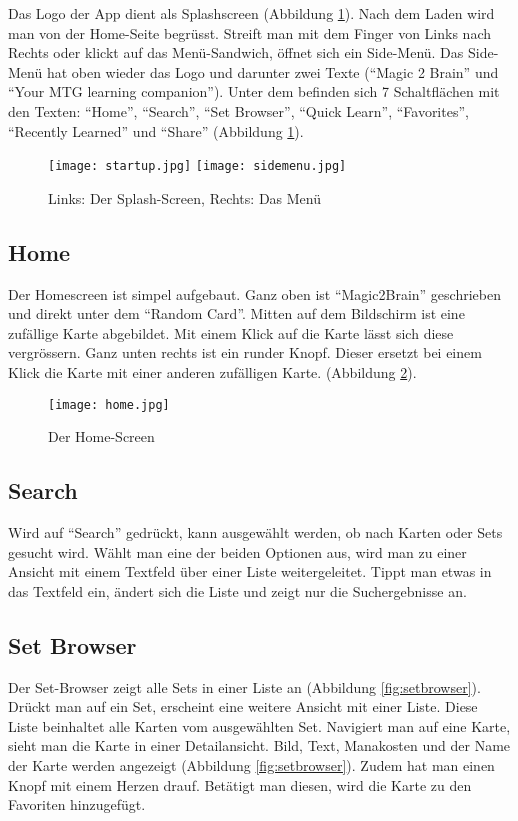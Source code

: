 Das Logo der App dient als Splashscreen (Abbildung \ref{fig:splashundmenu}). Nach dem Laden wird man von der Home-Seite begrüsst. Streift man mit dem Finger von Links nach Rechts oder klickt auf das Menü-Sandwich, öffnet sich ein Side-Menü. Das Side-Menü hat oben wieder das Logo und darunter zwei Texte ("`Magic 2 Brain"' und "`Your MTG learning companion"'). Unter dem befinden sich 7 Schaltflächen mit den Texten: "`Home"', "`Search"', "`Set Browser"', "`Quick Learn"', "`Favorites"', "`Recently Learned"' und "`Share"' (Abbildung \ref{fig:splashundmenu}).

\begin{figure}[htbp]
 \centering
    \texttt{[image: startup.jpg]}
    \texttt{[image: sidemenu.jpg]}
 \caption{Links: Der Splash-Screen, Rechts: Das Menü}
 \label{fig:splashundmenu}
\end{figure}

\subsection{Home}
Der Homescreen ist simpel aufgebaut. Ganz oben ist "`Magic2Brain"' geschrieben und direkt unter dem "`Random Card"'. Mitten auf dem Bildschirm ist eine zufällige Karte abgebildet. Mit einem Klick auf die Karte lässt sich diese vergrössern. Ganz unten rechts ist ein runder Knopf. Dieser ersetzt bei einem Klick die Karte mit einer anderen zufälligen Karte. (Abbildung \ref{fig:homemenu}).

\begin{figure}[htbp]
 \centering
    \texttt{[image: home.jpg]}
 \caption{Der Home-Screen \cite{Magiccard}}
 \label{fig:homemenu}
\end{figure}

\subsection{Search}
Wird auf "`Search"' gedrückt, kann ausgewählt werden, ob nach Karten oder Sets gesucht wird. Wählt man eine der beiden Optionen aus, wird man zu einer Ansicht mit einem Textfeld über einer Liste weitergeleitet. Tippt man etwas in das Textfeld ein, ändert sich die Liste und zeigt nur die Suchergebnisse an.

\subsection{Set Browser}
Der Set-Browser zeigt alle Sets in einer Liste an (Abbildung \ref{fig:setbrowser}). Drückt man auf ein Set, erscheint eine weitere Ansicht mit einer Liste. Diese Liste beinhaltet alle Karten vom ausgewählten Set. Navigiert man auf eine Karte, sieht man die Karte in einer Detailansicht. Bild, Text, Manakosten und der Name der Karte werden angezeigt (Abbildung \ref{fig:setbrowser}). Zudem hat man einen Knopf mit einem Herzen drauf. Betätigt man diesen, wird die Karte zu den Favoriten hinzugefügt.


